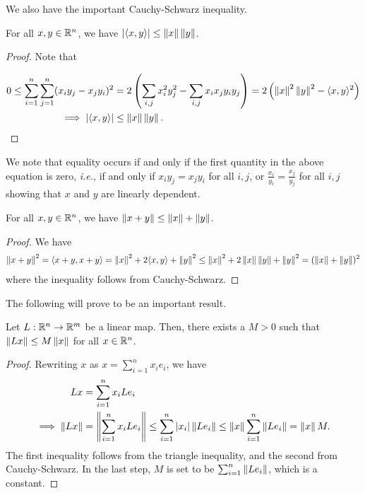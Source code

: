We also have the important Cauchy-Schwarz inequality.
\begin{theorem}
    For all $x,y \in \mathbb{R}^{n}$, we have $\left| \langle x,y\rangle \right| \leq \left\lVert x\right\rVert \left\lVert y\right\rVert$.
\end{theorem}
\begin{proof}
    Note that 
    
    \begin{align}
        0 \leq \sum_{i=1}^{n} \sum_{j=1}^{n} (x_{i}y_{j}-x_{j}y_{i})^{2} &= 2\left(\sum_{i,j} x_{i}^{2}y_{j}^{2}- \sum_{i,j} x_{i}x_{j}y_{i}y_{j}\right) = 2 \left( \left\lVert x\right\rVert^{2}\left\lVert y\right\rVert^{2} - \langle x,y\rangle^{2} \right) \\ \implies \left| \langle x,y\rangle \right| &\leq \left\lVert x\right\rVert\left\lVert y\right\rVert.
    \end{align}
\end{proof}
We note that equality occurs if and only if the first quantity in the above equation is zero, \textit{i.e.}, if and only if $x_{i}y_{j} = x_{j}y_{i}$ for all $i,j$, or $\frac{x_{i}}{y_{i}} = \frac{x_{j}}{y_{j}}$ for all $i,j$ showing that $x$ and $y$ are linearly dependent.
\begin{corollary}
    For all $x,y \in \mathbb{R}^{n}$, we have $\left\lVert x+y\right\rVert \leq \left\lVert x\right\rVert + \left\lVert y\right\rVert$.
\end{corollary}
\begin{proof}
    We have
    \begin{align}
        \left\lVert x+y\right\rVert^{2} = \langle x+y,x+y\rangle = \left\lVert x\right\rVert^{2} + 2\langle x,y\rangle + \left\lVert y\right\rVert^{2} \leq \left\lVert x\right\rVert^{2} + 2\left\lVert x\right\rVert\left\lVert y\right\rVert + \left\lVert y\right\rVert^{2} = (\left\lVert x\right\rVert+\left\lVert y\right\rVert)^{2}
    \end{align}
    where the inequality follows from Cauchy-Schwarz.
\end{proof}
The following will prove to be an important result.
\begin{theorem}
    Let $L:\mathbb{R}^{n} \to \mathbb{R}^{m}$ be a linear map. Then, there exists a $M > 0$ such that $\left\lVert Lx\right\rVert \leq M \left\lVert x\right\rVert$ for all $x \in \mathbb{R}^{n}$.
\end{theorem}
\begin{proof}
    Rewriting $x$ as $x = \sum_{i=1}^{n} x_{i} e_{i}$, we have
    \begin{align}
        Lx &= \sum_{i=1}^{n} x_{i} Le_{i} \notag \\
        \implies \left\lVert Lx\right\rVert &= \left\lVert\sum_{i=1}^{n} x_{i} Le_{i}\right\rVert \leq \sum_{i=1}^{n} \left| x_{i} \right| \left\lVert Le_{i}\right\rVert \leq \left\lVert x\right\rVert \sum_{i=1}^{n} \left\lVert Le_{i}\right\rVert = \left\lVert x\right\rVert M.
    \end{align}
    The first inequality follows from the triangle inequality, and the second from Cauchy-Schwarz. In the last step, $M$ is set to be $\sum_{i=1}^{n} \left\lVert Le_{i}\right\rVert$, which is a constant.
\end{proof}
